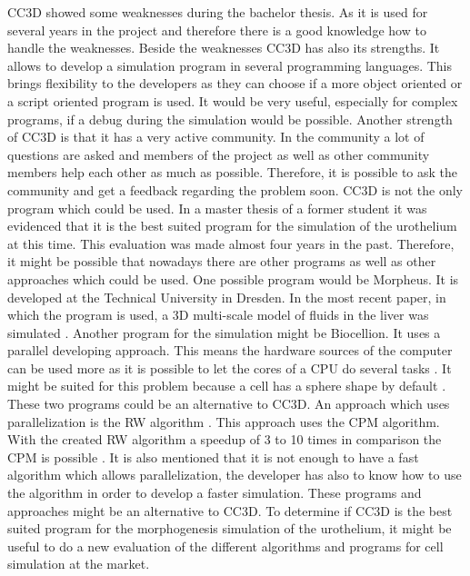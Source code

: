 \ac{CC3D} showed some weaknesses during the bachelor thesis. As it is used for several years in the project and therefore there is a good knowledge how to handle the weaknesses. Beside the weaknesses \ac{CC3D} has also its strengths. It allows to develop a simulation program in several programming languages.  This brings flexibility to the developers as they can choose if a more object oriented or a script oriented program is used. It would be very useful, especially for complex programs, if a debug during the simulation would be possible. Another strength of \ac{CC3D} is that it has a very active community. In the community a lot of questions are asked and members of the project as well as other community members help each other as much as possible. Therefore, it is possible to ask the community and get a feedback regarding the problem soon. \newline
\ac{CC3D} is not the only program which could be used. In a master thesis of a former student it was evidenced that it is the best suited program for the simulation of the urothelium \cite{MSCAngelo} at this time. This evaluation was made almost four years in the past. Therefore, it might be possible that nowadays there are other programs as well as other approaches which could be used. One possible program would be Morpheus. It is developed at the Technical University in Dresden. In the most recent paper, in which the program is used, a 3D multi-scale model of fluids in the liver was simulated \cite{Meyer2017}. Another program for the simulation might be Biocellion. It uses a parallel developing approach. This means the hardware sources of the computer can be used more as it is possible to let the cores of a CPU do several tasks \cite{Kang2014}. It might be suited for this problem because a cell has a sphere shape by default \cite{Kang2014}. These two programs could be an alternative to \ac{CC3D}. \newline
An approach which uses parallelization is the \ac{RW} algorithm \cite{Cercato2006}. This approach uses the \ac{CPM} algorithm. With the created \ac{RW} algorithm a speedup of 3 to 10 times in comparison the \ac{CPM} is possible \cite{Cercato2006}. It is also mentioned that it is not enough to have a fast algorithm which allows parallelization, the developer has also to know how to use the algorithm in order to develop a faster simulation. \newline
These programs and approaches might be an alternative to \ac{CC3D}. To determine if \ac{CC3D} is the best suited program for the morphogenesis simulation of the urothelium, it might be useful to do a new evaluation of the different algorithms and programs for cell simulation at the market.



